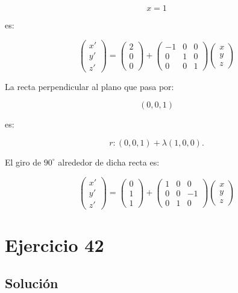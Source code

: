 \documentclass[11pt,a4paper]{article}
\begin{document}
\[
x=1
\]

es:

\[
\boxed{
\begin{pmatrix}
x'\\
y'\\
z'
\end{pmatrix}
=
\begin{pmatrix}
2\\
0\\
0
\end{pmatrix}
+
\begin{pmatrix}
-1&0&0\\
0&1&0\\
0&0&1
\end{pmatrix}
\begin{pmatrix}
x\\
y\\
z
\end{pmatrix}
}
\]

La recta perpendicular al plano que pasa por:

\[
(0,0,1)
\]

es:

\[
r:
(0,0,1)+\lambda(1,0,0).
\]

El giro de \(90^\circ\) alrededor de dicha recta es:

\[
\boxed{
\begin{pmatrix}
x'\\
y'\\
z'
\end{pmatrix}
=
\begin{pmatrix}
0\\
1\\
1
\end{pmatrix}
+
\begin{pmatrix}
1&0&0\\
0&0&-1\\
0&1&0
\end{pmatrix}
\begin{pmatrix}
x\\
y\\
z
\end{pmatrix}
}
\]

\section{Ejercicio 42}
\subsection{Solución}
\end{document}
